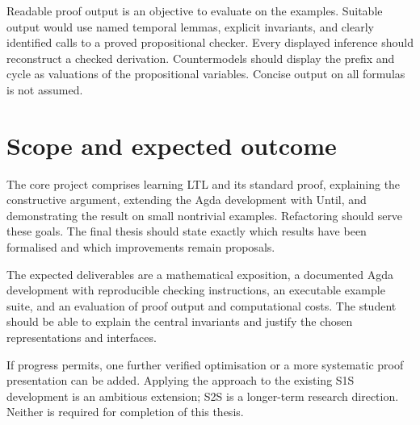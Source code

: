 \documentclass[11pt,a4paper]{article}
\begin{document}
Readable proof output is an objective to evaluate on the examples. Suitable
output would use named temporal lemmas, explicit invariants, and clearly
identified calls to a proved propositional checker. Every displayed
inference should reconstruct a checked derivation. Countermodels should
display the prefix and cycle as valuations of the propositional variables.
Concise output on all formulas is not assumed.

\section{Scope and expected outcome}

The core project comprises learning LTL and its standard proof, explaining
the constructive argument, extending the Agda development with Until,
and demonstrating the result on small nontrivial examples. Refactoring
should serve these goals. The final thesis should state exactly which
results have been formalised and which improvements remain proposals.

The expected deliverables are a mathematical exposition, a documented Agda
development with reproducible checking instructions, an executable example
suite, and an evaluation of proof output and computational costs. The
student should be able to explain the central invariants and justify the
chosen representations and interfaces.

If progress permits, one further verified optimisation or a more systematic
proof presentation can be added. Applying the approach to the existing
S1S development is an ambitious extension; S2S is a longer-term research
direction. Neither is required for completion of this thesis.
\end{document}
